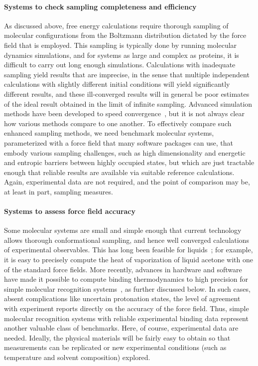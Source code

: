 \documentclass[aps,pre,twocolumn,nofootinbib,superscriptaddress,10pt, final,tightenlines]{revtex4-1}
\begin{document}
\paragraph{Systems to check sampling completeness and efficiency}
\label{sec:hard-sampling}
As discussed above, free energy calculations require thorough sampling of molecular configurations from the Boltzmann distribution dictated by the force field that is employed. 
This sampling is typically done by running molecular dynamics simulations, and for systems as large and complex as proteins, it is difficult to carry out long enough simulations. 
Calculations with inadequate sampling yield results that are imprecise, in the sense that multiple independent calculations with slightly different initial conditions will yield significantly different results, and these ill-converged results will in general be poor estimates of the ideal result obtained in the limit of infinite sampling. 
Advanced simulation methods have been developed to speed convergence~\cite{tai_conformational_2004, shirts_introduction_2013},  but it is not always clear how various methods compare to one another. 
To effectively compare such enhanced sampling methods, we need benchmark molecular systems, parameterized with a force field that many software packages can use, that embody various sampling challenges, such as high dimensionality and energetic and entropic barriers between highly occupied states, but which are just tractable enough that reliable results are available via suitable reference calculations.
Again, experimental data are not required, and the point of comparison may be, at least in part, sampling measures.

\paragraph{Systems to assess force field accuracy}
\label{pgph:accuracy}
Some molecular systems are small and simple enough that current technology allows thorough conformational sampling, and hence well converged calculations of experimental observables. 
This has long been feasible for liquids~\cite{jorgensen_quantum_1981}; for example, it is easy to precisely compute the heat of vaporization of liquid acetone with one of the standard force fields.
More recently, advances in hardware and software have made it possible to compute binding thermodynamics to high precision for
simple molecular recognition systems~\cite{henriksen_computational_2015}, as further discussed below. 
In such cases, absent complications like uncertain protonation states, the level of agreement with experiment reports directly on the accuracy of the force field.
Thus, simple molecular recognition systems with reliable experimental binding data represent another valuable class of benchmarks.
Here, of course, experimental data are needed. Ideally, the physical materials will be fairly easy to obtain so that measurements can be replicated or new experimental conditions (such as temperature and solvent composition) explored.
\end{document}
